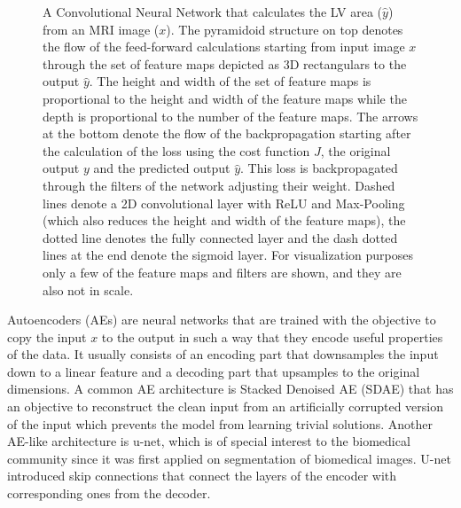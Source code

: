 \documentclass[journal]{IEEEtran}
\begin{document}
\begin{figure}[!t]
	\caption{A Convolutional Neural Network that calculates the LV area ($\hat{y}$) from an MRI image ($x$).
		The pyramidoid structure on top denotes the flow of the feed-forward calculations starting from input image $x$ through the set of feature maps depicted as 3D rectangulars to the output $\hat{y}$.
		The height and width of the set of feature maps is proportional to the height and width of the feature maps while the depth is proportional to the number of the feature maps.
		The arrows at the bottom denote the flow of the backpropagation starting after the calculation of the loss using the cost function $J$, the original output $y$ and the predicted output $\hat{y}$.
		This loss is backpropagated through the filters of the network adjusting their weight.
		Dashed lines denote a 2D convolutional layer with ReLU and Max-Pooling (which also reduces the height and width of the feature maps), the dotted line denotes the fully connected layer and the dash dotted lines at the end denote the sigmoid layer.
		For visualization purposes only a few of the feature maps and filters are shown, and they are also not in scale.}
	\label{fig:cnn}
\end{figure}

Autoencoders (AEs) are neural networks that are trained with the objective to copy the input $x$ to the output in such a way that they encode useful properties of the data.
It usually consists of an encoding part that downsamples the input down to a linear feature and a decoding part that upsamples to the original dimensions.
A common AE architecture is Stacked Denoised AE (SDAE) that has an objective to reconstruct the clean input from an artificially corrupted version of the input\cite{vincent2010stacked} which prevents the model from learning trivial solutions.
Another AE-like architecture is u-net\cite{ronneberger2015u}, which is of special interest to the biomedical community since it was first applied on segmentation of biomedical images.
U-net introduced skip connections that connect the layers of the encoder with corresponding ones from the decoder.
\end{document}
